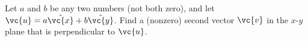 Let $a$ and $b$ be any two numbers (not both zero),
and let $\vc{u}=a\hat{\vc{x}}+b\hat{\vc{y}}$.
Find a (nonzero) second vector $\vc{v}$ in the $x$-$y$ plane
that is perpendicular to $\vc{u}$.
